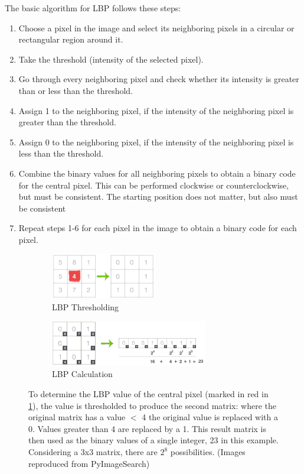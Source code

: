 \documentclass[letterpaper]{report}
\begin{document}
The basic algorithm for LBP follows these steps:
\begin{enumerate}
	\item{Choose a pixel in the image and select its neighboring pixels in a circular or rectangular region around it.}
	\item{Take the threshold (intensity of the selected pixel).}
	\item{Go through every neighboring pixel and check whether its intensity is greater than or less than the threshold.}
	\item{Assign 1 to the neighboring pixel, if the intensity of the neighboring pixel is greater than the threshold.}
	\item{Assign 0 to the neighboring pixel, if the intensity of the neighboring pixel is less than the threshold.}
	\item{Combine the binary values for all neighboring pixels to obtain a binary code for the central pixel. This can be performed clockwise or counterclockwise, but must be consistent. The starting position does not matter, but also must be consistent}
	\item{Repeat steps 1-6 for each pixel in the image to obtain a binary code for each pixel.}
\end{enumerate}

\begin{figure}[H]
	\begin{subfigure}[h]{0.48\linewidth}
		\centering
		\includegraphics[height=2cm]{./figures/lbp_thresholding.jpg}
		\caption{LBP Thresholding}
		\label{subfig:lbp-thresholding}	
	\end{subfigure}
	\hfill
	\begin{subfigure}[h]{0.48\linewidth}
		\centering
		\includegraphics[height=2cm]{./figures/lbp_calculation.jpg}
		\caption{LBP Calculation}
		\label{subfig:lbp-calculation}		
	\end{subfigure}%
	\caption[Local Binary Pattern thresholding and calculation]{To determine the LBP value of the central pixel (marked in red in \ref{subfig:lbp-thresholding}), the value is thresholded to produce the second matrix: where the original matrix has a value $<$ 4 the original value is replaced with a 0. Values greater than 4 are replaced by a 1. This result matrix is then used as the binary values of a single integer, 23 in this example. Considering a 3x3 matrix, there are $2^8$ possibilities. (Images reproduced from PyImageSearch)}
	\label{fig:lbp}
\end{figure}
\end{document}
